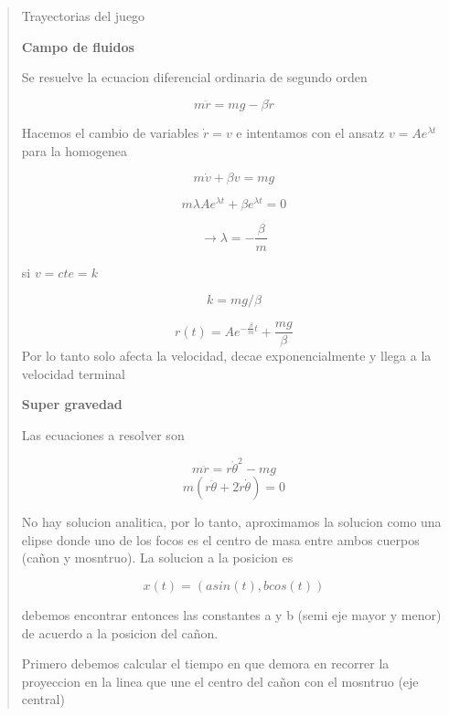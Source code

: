 \documentclass[a4paper, 10pt]{article}
\begin{document}
\begin{quote}
\begin{minipage}{1.5cm}
\end{minipage}  
 \begin{minipage}{6cm}
 \vspace{0.5cm}
 
\end{minipage}
\begin{center}

{\huge Trayectorias del juego}\\
\vspace{0.3 cm}

\hrulefill
\end{center}
 
\textbf{Campo de fluidos}

Se resuelve la ecuacion diferencial ordinaria de segundo orden

$$m \ddot r = mg - \beta \dot r $$

Hacemos el cambio de variables $\dot r = v$ e intentamos con el ansatz $v=Ae^{\lambda t}$ para la homogenea

$$m \dot v + \beta v = mg $$

$$ m \lambda A e^{\lambda t}+ \beta e^{\lambda t}=0 $$

$$ \rightarrow \lambda= - \frac{\beta }{m} $$


si $v= cte=k$

$$ k = mg/\beta$$

$$ r(t)= Ae^{- \frac{\beta }{m} t}+ \frac{mg}{\beta} $$
Por lo tanto solo afecta la velocidad, decae exponencialmente y llega a la velocidad terminal 

\textbf{Super gravedad}


Las ecuaciones a resolver son


$$m \ddot r = r\dot \theta^2 -mg $$
$$ m(r\ddot \theta + 2 \dot r \dot \theta)=0 $$

No hay solucion analitica, por lo tanto, aproximamos la solucion como una elipse donde uno de los focos es el centro de masa entre ambos cuerpos (cañon y mosntruo). La solucion a la posicion es 

$$x(t)= (a sin(t), b cos(t))$$

debemos encontrar entonces las constantes a y b (semi eje mayor y menor) de acuerdo a la posicion del cañon.

Primero debemos calcular el tiempo en que demora en recorrer la proyeccion  en la linea que une el centro del cañon con el mosntruo (eje central)


\end{quote}
\end{document}
